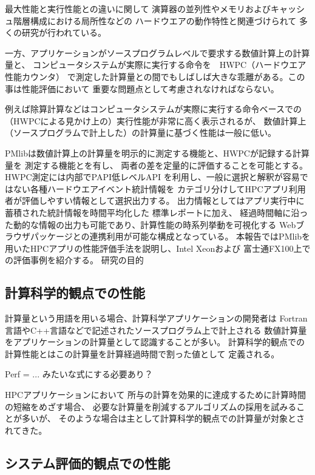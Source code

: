 \documentclass[submit,techrep,noauthor]{ipsj}
\begin{document}
最大性能と実行性能との違いに関して
演算器の並列性やメモリおよびキャッシュ階層構成における局所性などの
ハードウエアの動作特性と関連づけられて
多くの研究が行われている。

一方、アプリケーションがソースプログラムレベルで要求する数値計算上の計算量と、
コンピュータシステムが実際に実行する命令を　HWPC（ハードウエア性能カウンタ）
で測定した計算量との間でもしばしば大きな乖離がある。この事は性能評価において
重要な問題点として考慮されなければならない。


{ \color{BLUE}
例えば除算計算などはコンピュータシステムが実際に実行する命令ベースでの
（HWPCによる見かけ上の）実行性能が非常に高く表示されるが、
数値計算上（ソースプログラムで計上した）の計算量に基づく性能は一般に低い。
}


PMlibは数値計算上の計算量を明示的に測定する機能と、HWPCが記録する計算量を
測定する機能とを有し、
両者の差を定量的に評価することを可能とする。HWPC測定には内部でPAPI低レベルAPI
を利用し、一般に選択と解釈が容易ではない各種ハードウエアイベント統計情報を
カテゴリ分けしてHPCアプリ利用者が評価しやすい情報として選択出力する。
出力情報としてはアプリ実行中に蓄積された統計情報を時間平均化した
標準レポートに加え、
経過時間軸に沿った動的な情報の出力も可能であり、計算性能の時系列挙動を可視化する
Webブラウザパッケージとの連携利用が可能な構成となっている。
本報告ではPMlibを用いたHPCアプリの性能評価手法を説明し、Intel Xeonおよび
富士通FX100上での評価事例を紹介する。
研究の目的

\subsection {計算科学的観点での性能}
計算量という用語を用いる場合、計算科学アプリケーションの開発者は
Fortran言語やC++言語などで記述されたソースプログラム上で計上される
数値計算量をアプリケーションの計算量として認識することが多い。
計算科学的観点での計算性能とはこの計算量を計算経過時間で割った値として
定義される。

{ \color{BLUE}
Perf = ... みたいな式にする必要あり？\\
}

HPCアプリケーションにおいて
所与の計算を効果的に達成するために計算時間の短縮をめざす場合、
必要な計算量を削減するアルゴリズムの採用を試みることが多いが、
そのような場合は主として計算科学的観点での計算量が対象とされてきた。


\subsection {システム評価的観点での性能}
\end{document}
